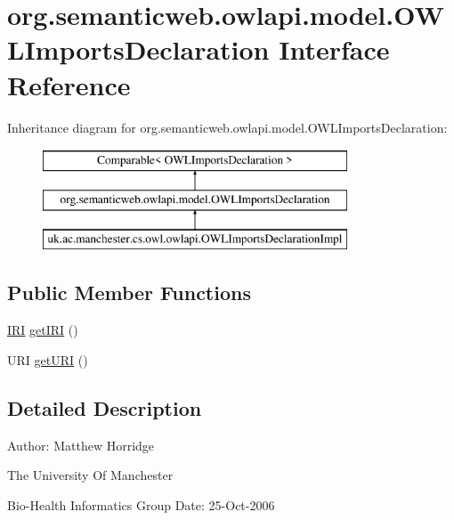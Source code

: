 \hypertarget{interfaceorg_1_1semanticweb_1_1owlapi_1_1model_1_1_o_w_l_imports_declaration}{\section{org.\-semanticweb.\-owlapi.\-model.\-O\-W\-L\-Imports\-Declaration Interface Reference}
\label{interfaceorg_1_1semanticweb_1_1owlapi_1_1model_1_1_o_w_l_imports_declaration}
}
Inheritance diagram for org.\-semanticweb.\-owlapi.\-model.\-O\-W\-L\-Imports\-Declaration\-:\begin{figure}[H]
\begin{center}
\leavevmode
\includegraphics[height=3.000000cm]{interfaceorg_1_1semanticweb_1_1owlapi_1_1model_1_1_o_w_l_imports_declaration}
\end{center}
\end{figure}
\subsection*{Public Member Functions}
\begin{DoxyCompactItemize}
\item 
\hyperlink{classorg_1_1semanticweb_1_1owlapi_1_1model_1_1_i_r_i}{I\-R\-I} \hyperlink{interfaceorg_1_1semanticweb_1_1owlapi_1_1model_1_1_o_w_l_imports_declaration_a88bb681b1880bd6051dbc079486e2a34}{get\-I\-R\-I} ()
\item 
U\-R\-I \hyperlink{interfaceorg_1_1semanticweb_1_1owlapi_1_1model_1_1_o_w_l_imports_declaration_a95ab86b4cb787e92cfdf0a0eb1b89b60}{get\-U\-R\-I} ()
\end{DoxyCompactItemize}


\subsection{Detailed Description}
Author\-: Matthew Horridge\par
 The University Of Manchester\par
 Bio-\/\-Health Informatics Group Date\-: 25-\/\-Oct-\/2006 

